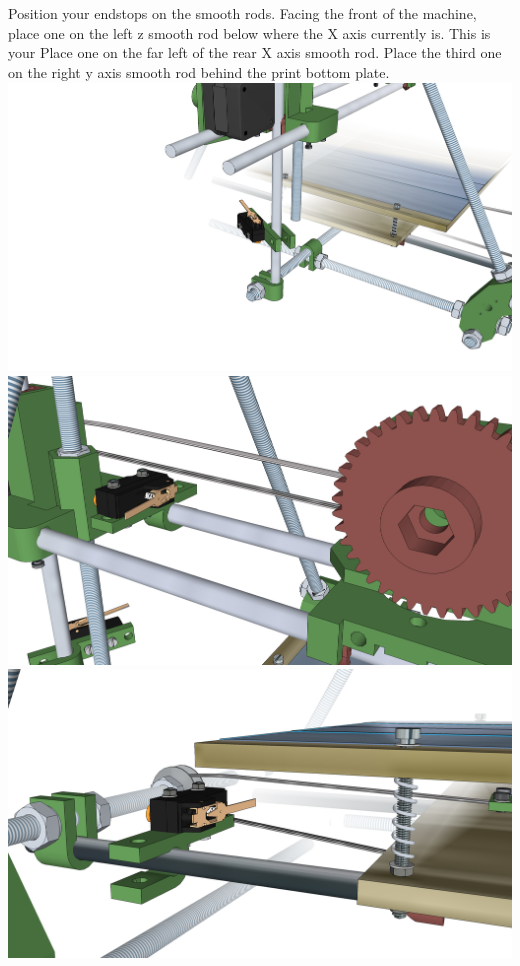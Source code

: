 \documentclass[twoside,a4paper,titlepage]{memoir}
\begin{document}
	\section{}
	Position your endstops on the smooth rods. Facing the front of the machine, place one on the left z
	smooth rod below where the X axis currently is. This is your Place one on the far left of the rear X axis
	smooth rod. Place the third one on the right y axis smooth rod behind the print bottom plate.\\
	\includegraphics[width=1\linewidth]{graphics/ch10_4_1.png}
	\includegraphics[width=1\linewidth]{graphics/ch10_4_2.png}
	\includegraphics[width=1\linewidth]{graphics/ch10_4_3.png}
	
\end{document}
